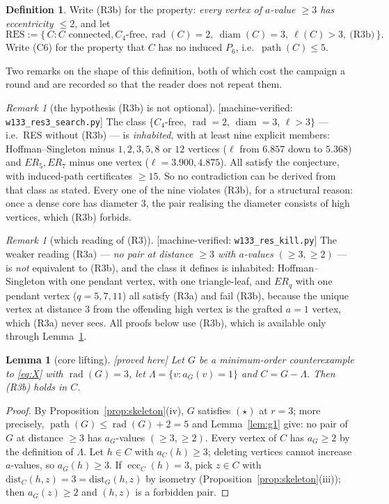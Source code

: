 \documentclass[11pt]{article}
\theoremstyle{plain}
\newtheorem{lemma}[theorem]{Lemma}
\theoremstyle{definition}
\newtheorem{definition}[theorem]{Definition}
\theoremstyle{remark}
\newtheorem{remark}[theorem]{Remark}
\numberwithin{equation}{section}
\newcommand{\rad}{\operatorname{rad}}
\newcommand{\ecc}{\operatorname{ecc}}
\newcommand{\diam}{\operatorname{diam}}
\newcommand{\pth}{\operatorname{path}}
\newcommand{\statusbox}[1]{{\small\sloppy\textsf{[#1]}}}
\newcommand{\PRVn}{\statusbox{proved here}}
\newcommand{\MV}[1]{\statusbox{machine-verified: \texttt{#1}}}
\begin{document}
\begin{definition}
Write (R3b) for the property: \emph{every vertex of $a$-value $\ge 3$ has eccentricity
$\le 2$}, and let
\[
  \mathrm{RES} := \{\, C : C \text{ connected}, C_4\text{-free},
  \rad(C) = 2,\ \diam(C) = 3,\ \ell(C) > 3,\ \text{(R3b)} \,\}.
\]
Write (C6) for the property that $C$ has no induced $P_6$, i.e.\ $\pth(C) \le 5$.
\end{definition}

Two remarks on the shape of this definition, both of which cost the campaign a round and are
recorded so that the reader does not repeat them.

\begin{remark}[the hypothesis (R3b) is not optional]\label{rem:live}
\MV{w133\_res3\_search.py}
The class $\{C_4$-free, $\rad = 2$, $\diam = 3$, $\ell > 3\}$ --- i.e.\ RES without (R3b) ---
is \emph{inhabited}, with at least nine explicit members: Hoffman--Singleton minus $1,2,3,5,8$
or $12$ vertices ($\ell$ from $6.857$ down to $5.368$) and $ER_5, ER_7$ minus one vertex
($\ell = 3.900, 4.875$). All satisfy the conjecture, with induced-path certificates $\ge 15$.
So no contradiction can be derived from that class as stated. Every one of the nine violates
(R3b), for a structural reason: once a dense core has diameter $3$, the pair realising the
diameter consists of high vertices, which (R3b) forbids.
\end{remark}

\begin{remark}[which reading of (R3)]\label{rem:r3a}
\MV{w133\_res\_kill.py}
The weaker reading (R3a) --- \emph{no pair at distance $\ge 3$ with $a$-values
$(\ge 3, \ge 2)$} --- is \emph{not} equivalent to (R3b), and the class it defines is
inhabited: Hoffman--Singleton with one pendant vertex, with one triangle-leaf, and $ER_q$
with one pendant vertex ($q = 5,7,11$) all satisfy (R3a) and fail (R3b), because the unique
vertex at distance $3$ from the offending high vertex is the grafted $a = 1$ vertex, which
(R3a) never sees. All proofs below use (R3b), which is available only through
Lemma~\ref{lem:g16}.
\end{remark}

\begin{lemma}[core lifting]\label{lem:g16}
\PRVn
Let $G$ be a minimum-order counterexample to \eqref{eq:X} with $\rad(G) = 3$, let
$\Lambda = \{v : a_G(v) = 1\}$ and $C = G - \Lambda$. Then (R3b) holds in $C$.
\end{lemma}

\begin{proof}
By Proposition~\ref{prop:skeleton}(iv), $G$ satisfies $(\star)$ at $r = 3$; more precisely,
$\pth(G) \le \rad(G)+2 = 5$ and Lemma~\ref{lem:g1} give: no pair of $G$ at distance $\ge 3$
has $a_G$-values $(\ge 3, \ge 2)$. Every vertex of $C$ has $a_G \ge 2$ by the definition of
$\Lambda$. Let $h \in C$ with $a_C(h) \ge 3$; deleting vertices cannot increase $a$-values,
so $a_G(h) \ge 3$. If $\ecc_C(h) = 3$, pick $z \in C$ with
$\mathrm{dist}_C(h,z) = 3 = \mathrm{dist}_G(h,z)$ by isometry
(Proposition~\ref{prop:skeleton}(iii)); then $a_G(z) \ge 2$ and $(h,z)$ is a forbidden pair.
\end{proof}
\end{document}
